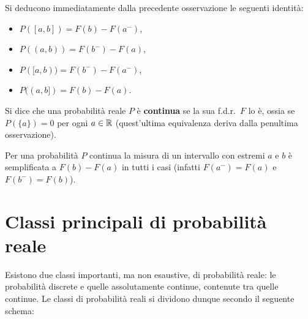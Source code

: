 \begin{multicols*}{2}
\begin{remark}
    Si deducono immediatamente dalla precedente osservazione le seguenti identità:
    \begin{itemize}
        \item $P([a, b]) = F(b) - F(a^-)$,
        \item $P((a, b)) = F(b^-) - F(a)$,
        \item $P([a, b)) = F(b^-) - F(a^-)$,
        \item $P((a, b]) = F(b) - F(a)$.
    \end{itemize} 
\end{remark}

\begin{definition}[$P$ continua]
    Si dice che una probabilità reale $P$ è \textbf{continua} se
    la sua f.d.r.~$F$ lo è, ossia se $P(\{a\}) = 0$ per ogni $a \in \RR$
    (quest'ultima equivalenza deriva dalla penultima osservazione). 
\end{definition}

\begin{remark}
    Per una probabilità $P$ continua la misura di un intervallo con estremi $a$ e $b$ è semplificata
    a $F(b) - F(a)$ in tutti i casi (infatti $F(a^-) = F(a)$ e $F(b^-) = F(b)$).  
\end{remark}

\section{Classi principali di probabilità reale}

Esistono due classi importanti, ma non esaustive, di probabilità reale: le
probabilità discrete e quelle assolutamente
continue, contenute tra quelle continue. Le classi di probabilità reali
si dividono dunque secondo il seguente schema:

\begin{center}

    \begin{tikzpicture}[x=0.75pt,y=0.75pt,yscale=-1,xscale=1,scale=0.8]
    

\end{tikzpicture}
\end{center}
\end{multicols*}
